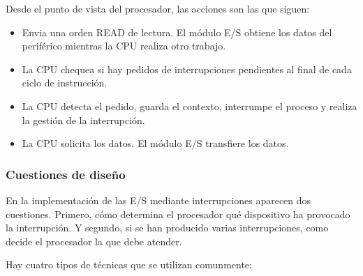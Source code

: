 Desde el punto de vista del procesador, las acciones son las que siguen:

\begin{itemize}
  \item Envia una orden READ de lectura. El módulo E/S obtiene los datos del periférico mientras la CPU realiza otro trabajo.
  \item La CPU chequea si hay pedidos de interrupciones pendientes al final de cada ciclo de instrucción.
  \item La CPU detecta el pedido, guarda el contexto, interrumpe el proceso y realiza la gestión de la interrupción.
  \item La CPU solicita los datos. El módulo E/S transfiere los datos.
\end{itemize}

\begin{subs}
  \subsubsection{Cuestiones de diseño}

  En la implementación de las E/S mediante interrupciones aparecen dos cuestiones. Primero, cómo determina el procesador qué dispositivo ha provocado la interrupción. Y segundo, si se han producido varias interrupciones, como decide el procesador la que debe atender.

  Hay cuatro tipos de técnicas que se utilizan comunmente:


\end{subs}
